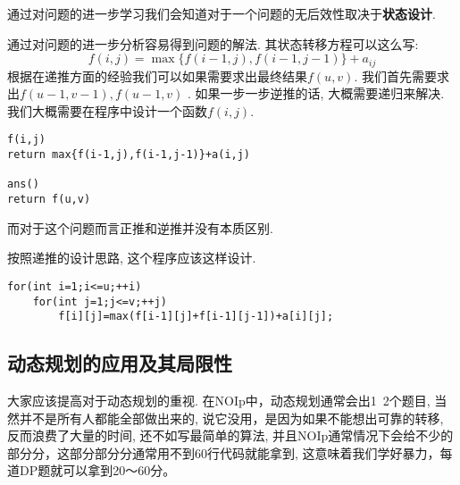 通过对问题的进一步学习我们会知道对于一个问题的无后效性取决于\textbf{状态设计}.


\begin{solve}
	通过对问题的进一步分析容易得到问题的解法.
	其状态转移方程可以这么写:
	\begin{equation*}
		f(i,j)=\max\{f(i-1,j),f(i-1,j-1)\}+a_{ij}
	\end{equation*}
	根据在递推方面的经验我们可以如果需要求出最终结果$f(u,v)$.
	我们首先需要求出$f(u-1,v-1), f(u-1,v)$ .
	如果一步一步逆推的话, 大概需要递归来解决.
	我们大概需要在程序中设计一个函数$f(i,j)$.
\begin{verbatim}
f(i,j)
return max{f(i-1,j),f(i-1,j-1)}+a(i,j)

ans()
return f(u,v)
\end{verbatim}
而对于这个问题而言正推和逆推并没有本质区别.

按照递推的设计思路, 这个程序应该这样设计.
\begin{verbatim}
for(int i=1;i<=u;++i)
	for(int j=1;j<=v;++j)
		f[i][j]=max(f[i-1][j]+f[i-1][j-1])+a[i][j];
\end{verbatim}
\end{solve}
\subsection{动态规划的应用及其局限性}
大家应该提高对于动态规划的重视.
在NOIp中，动态规划通常会出1~2个题目, 当然并不是所有人都能全部做出来的, 说它没用，是因为如果不能想出可靠的转移, 反而浪费了大量的时间, 还不如写最简单的算法, 并且NOIp通常情况下会给不少的部分分，这部分部分分通常用不到60行代码就能拿到, 这意味着我们学好暴力，每道DP题就可以拿到20～60分。

